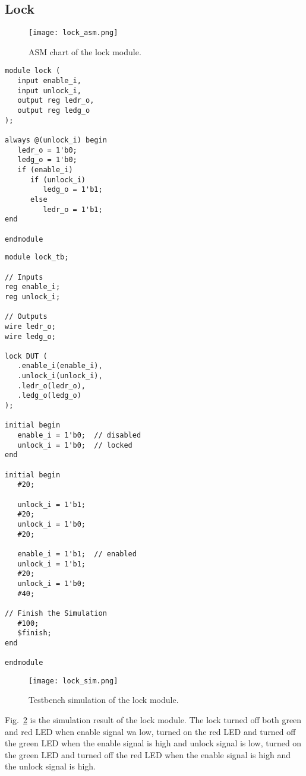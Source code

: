 \subsection{Lock}

\begin{figure}[htbp]
   \centering
   \texttt{[image: lock\_asm.png]}
   \caption{ASM chart of the lock module.}
   \label{fig:lock_asm}
\end{figure}

\begin{verbatim}
module lock (
   input enable_i,
   input unlock_i,
   output reg ledr_o,
   output reg ledg_o
);

always @(unlock_i) begin
   ledr_o = 1'b0;
   ledg_o = 1'b0;
   if (enable_i)
      if (unlock_i)
         ledg_o = 1'b1;
      else
         ledr_o = 1'b1;
end

endmodule
\end{verbatim}

\begin{verbatim}
module lock_tb;

// Inputs
reg enable_i;
reg unlock_i;

// Outputs
wire ledr_o;
wire ledg_o;

lock DUT (
   .enable_i(enable_i),
   .unlock_i(unlock_i),
   .ledr_o(ledr_o),
   .ledg_o(ledg_o)
);

initial begin
   enable_i = 1'b0;  // disabled
   unlock_i = 1'b0;  // locked
end

initial begin
   #20;

   unlock_i = 1'b1;
   #20;
   unlock_i = 1'b0;
   #20;

   enable_i = 1'b1;  // enabled
   unlock_i = 1'b1;
   #20;
   unlock_i = 1'b0;
   #40;

// Finish the Simulation
   #100;
   $finish;
end

endmodule
\end{verbatim}

\begin{figure}[htbp]
   \centerline{
   \texttt{[image: lock\_sim.png]}}
   \caption{Testbench simulation of the lock module.}
   \label{fig:lock_sim}
\end{figure}

Fig.~\ref{fig:lock_sim} is the simulation result of the lock module. The lock turned off both green and red LED when enable signal wa low, turned on the red LED and turned off the green LED when the enable signal is high and unlock signal is low, turned on the green LED and turned off the red LED when the enable signal is high and the unlock signal is high.
